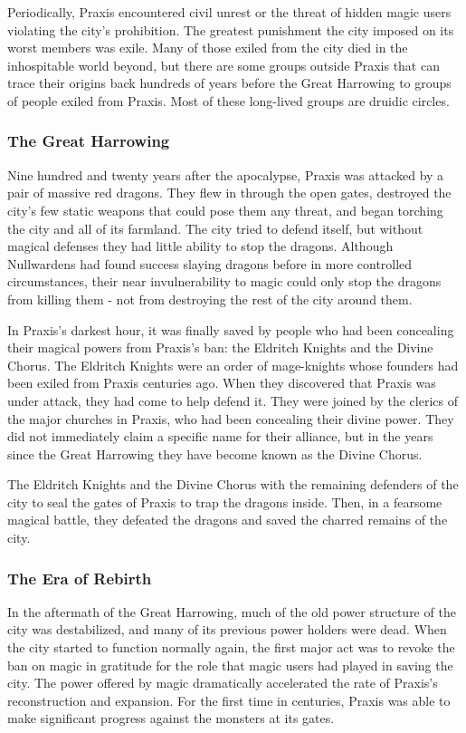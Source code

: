            Periodically, Praxis encountered civil unrest or the threat of hidden magic users violating the city's prohibition.
            The greatest punishment the city imposed on its worst members was exile.
            Many of those exiled from the city died in the inhospitable world beyond, but there are some groups outside Praxis that can trace their origins back hundreds of years before the Great Harrowing to groups of people exiled from Praxis.
            Most of these long-lived groups are druidic circles.

        \subsubsection{The Great Harrowing}
            Nine hundred and twenty years after the apocalypse, Praxis was attacked by a pair of massive red dragons.
            They flew in through the open gates, destroyed the city's few static weapons that could pose them any threat, and began torching the city and all of its farmland.
            The city tried to defend itself, but without magical defenses they had little ability to stop the dragons.
            Although Nullwardens had found success slaying dragons before in more controlled circumstances, their near invulnerability to magic could only stop the dragons from killing them - not from destroying the rest of the city around them.

            In Praxis's darkest hour, it was finally saved by people who had been concealing their magical powers from Praxis's ban: the Eldritch Knights and the Divine Chorus.
            The Eldritch Knights were an order of mage-knights whose founders had been exiled from Praxis centuries ago.
            When they discovered that Praxis was under attack, they had come to help defend it.
            They were joined by the clerics of the major churches in Praxis, who had been concealing their divine power.
            They did not immediately claim a specific name for their alliance, but in the years since the Great Harrowing they have become known as the Divine Chorus.

            The Eldritch Knights and the Divine Chorus with the remaining defenders of the city to seal the gates of Praxis to trap the dragons inside.
            Then, in a fearsome magical battle, they defeated the dragons and saved the charred remains of the city.

        \subsubsection{The Era of Rebirth}
            In the aftermath of the Great Harrowing, much of the old power structure of the city was destabilized, and many of its previous power holders were dead.
            When the city started to function normally again, the first major act was to revoke the ban on magic in gratitude for the role that magic users had played in saving the city.
            The power offered by magic dramatically accelerated the rate of Praxis's reconstruction and expansion.
            For the first time in centuries, Praxis was able to make significant progress against the monsters at its gates.

